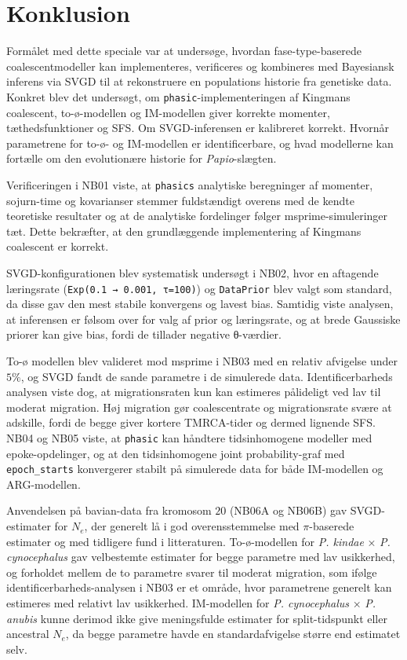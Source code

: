 \documentclass[
  10pt,
  a4paper,
]{scrbook}
\let\oldemph\emph
\renewcommand\emph[1]{\oldemph{\color{gray}#1}}
\begin{document}
\chapter{Konklusion}\label{konklusion}

Formålet med dette speciale var at undersøge, hvordan fase-type-baserede
coalescentmodeller kan implementeres, verificeres og kombineres med
Bayesiansk inferens via SVGD til at rekonstruere en populations historie
fra genetiske data. Konkret blev det undersøgt, om
\texttt{phasic}-implementeringen af Kingmans coalescent, to-ø-modellen
og IM-modellen giver korrekte momenter, tæthedsfunktioner og SFS. Om
SVGD-inferensen er kalibreret korrekt. Hvornår parametrene for to-ø- og
IM-modellen er identificerbare, og hvad modellerne kan fortælle om den
evolutionære historie for \emph{Papio}-slægten.

Verificeringen i NB01 viste, at \texttt{phasics} analytiske beregninger
af momenter, sojurn-time og kovarianser stemmer fuldstændigt overens med
de kendte teoretiske resultater og at de analytiske fordelinger følger
msprime-simuleringer tæt. Dette bekræfter, at den grundlæggende
implementering af Kingmans coalescent er korrekt.

SVGD-konfigurationen blev systematisk undersøgt i NB02, hvor en
aftagende læringsrate (\texttt{Exp(0.1\ →\ 0.001,\ τ=100)}) og
\texttt{DataPrior} blev valgt som standard, da disse gav den mest
stabile konvergens og lavest bias. Samtidig viste analysen, at
inferensen er følsom over for valg af prior og læringsrate, og at brede
Gaussiske priorer kan give bias, fordi de tillader negative θ-værdier.

To-ø modellen blev valideret mod msprime i NB03 med en relativ afvigelse
under \(5\%\), og SVGD fandt de sande parametre i de simulerede data.
Identificerbarheds analysen viste dog, at migrationsraten kun kan
estimeres pålideligt ved lav til moderat migration. Høj migration gør
coalescentrate og migrationsrate svære at adskille, fordi de begge giver
kortere TMRCA-tider og dermed lignende SFS. NB04 og NB05 viste, at
\texttt{phasic} kan håndtere tidsinhomogene modeller med
epoke-opdelinger, og at den tidsinhomogene joint probability-graf med
\texttt{epoch\_starts} konvergerer stabilt på simulerede data for både
IM-modellen og ARG-modellen.

Anvendelsen på bavian-data fra kromosom \(20\) (NB06A og NB06B) gav
SVGD-estimater for \(N_e\), der generelt lå i god overensstemmelse med
\(\pi\)-baserede estimater og med tidligere fund i litteraturen.
To-ø-modellen for \emph{P. kindae} × \emph{P. cynocephalus} gav
velbestemte estimater for begge parametre med lav usikkerhed, og
forholdet mellem de to parametre svarer til moderat migration, som
ifølge identificerbarheds-analysen i NB03 er et område, hvor parametrene
generelt kan estimeres med relativt lav usikkerhed. IM-modellen for
\emph{P. cynocephalus} × \emph{P. anubis} kunne derimod ikke give
meningsfulde estimater for split-tidspunkt eller ancestral \(N_e\), da
begge parametre havde en standardafvigelse større end estimatet selv.
\end{document}
